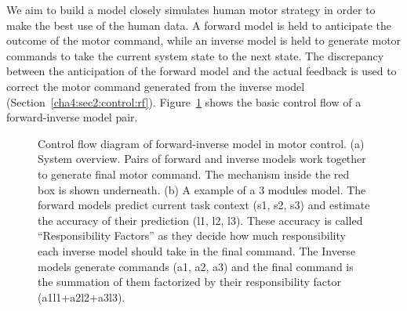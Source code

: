 We aim to build a model closely simulates human motor strategy in order to make the best use of the human data. A forward model is held to anticipate the outcome of the motor command, while an inverse model is held to generate motor commands to take the current system state to the next state. The discrepancy between the anticipation of the forward model and the actual feedback is used to correct the motor command generated from the inverse model (Section~\ref{cha4:sec2:control:rf}). Figure~\ref{fig:control} shows the basic control flow of a forward-inverse model pair.

\begin{figure}
  \centering
      \vspace{0.5cm}
  \caption{ \scriptsize{Control flow diagram of forward-inverse model in motor control. (a) System overview. Pairs of forward and inverse models work together to generate final motor command. The mechanism inside the red box is shown underneath. (b) A example of a 3 modules model. The forward models predict current task context (s1, s2, s3) and estimate the accuracy of their prediction (l1, l2, l3). These accuracy is called ``Responsibility Factors'' as they decide how much responsibility each inverse model should take in the final command. The Inverse models generate commands (a1, a2, a3) and the final command is the summation of them factorized by their responsibility factor (a1l1+a2l2+a3l3).  }
}
\label{fig:control}
\end{figure}

